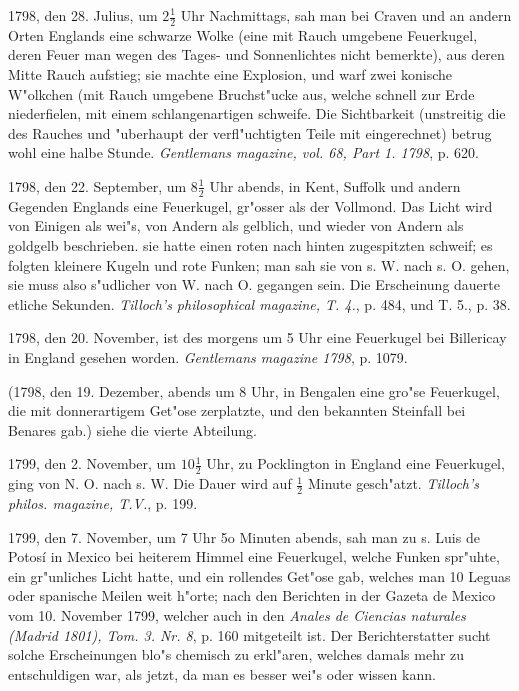 \documentclass[a4paper, 11pt, oneside, polutonikogreek, german]{article}
\begin{document}
1798, den 28. Julius, um $\mathfrak{2\frac{1}{2}}$ Uhr Nachmittags, sah man bei Craven und an andern Orten Englands eine schwarze Wolke (eine mit Rauch umgebene Feuerkugel, deren Feuer man wegen des Tages- und Sonnenlichtes nicht bemerkte), aus deren Mitte Rauch aufstieg; sie machte eine Explosion, und warf zwei konische W"olkchen (mit Rauch umgebene Bruchst"ucke aus, welche schnell zur Erde niederfielen, mit einem schlangenartigen schweife. Die Sichtbarkeit (unstreitig die des Rauches und "uberhaupt der verfl"uchtigten Teile mit eingerechnet) betrug wohl eine halbe Stunde. \emph{Gentlemans magazine, vol. 68, Part 1. 1798}, p. 620.

1798, den 22. September, um $\mathfrak{8\frac{1}{2}}$ Uhr abends, in Kent, Suffolk und andern Gegenden Englands eine Feuerkugel, gr"osser als der Vollmond. Das Licht wird von Einigen als wei"s, von Andern als gelblich, und wieder von Andern als goldgelb beschrieben. sie hatte einen roten nach hinten zugespitzten schweif; es folgten kleinere Kugeln und rote Funken; man sah sie von s. W. nach s. O. gehen, sie muss also s"udlicher von W. nach O. gegangen sein. Die Erscheinung dauerte etliche Sekunden. \emph{Tilloch's philosophical magazine, T. 4.}, p. 484, und T. 5., p. 38.

1798, den 20. November, ist des morgens um 5 Uhr eine Feuerkugel bei Billericay in England gesehen worden. \emph{Gentlemans magazine 1798}, p. 1079.

(1798, den 19. Dezember, abends um 8 Uhr, in Bengalen eine gro"se Feuerkugel, die mit donnerartigem Get"ose zerplatzte, und den bekannten Steinfall bei Benares gab.) siehe die vierte Abteilung.

1799, den 2. November, um $\mathfrak{10\frac{1}{2}}$ Uhr, zu Pocklington in England eine Feuerkugel, ging von N. O. nach s. W. Die Dauer wird auf $\mathfrak{\frac{1}{2}}$ Minute gesch"atzt. \emph{Tilloch's philos. magazine, T.V.}, p. 199.

1799, den 7. November, um 7 Uhr 5o Minuten abends, sah man zu s. Luis de Potosí in Mexico bei heiterem Himmel eine Feuerkugel, welche Funken spr"uhte, ein gr"unliches Licht hatte, und ein rollendes Get"ose gab, welches man 10 Leguas oder spanische Meilen weit h"orte; nach den Berichten in der Gazeta de Mexico vom 10. November 1799, welcher auch in den \emph{Anales de Ciencias naturales (Madrid 1801), Tom. 3. Nr. 8}, p. 160 mitgeteilt ist. Der Berichterstatter sucht solche Erscheinungen blo"s chemisch zu erkl"aren, welches damals mehr zu entschuldigen war, als jetzt, da man es besser wei"s oder wissen kann.
\end{document}
